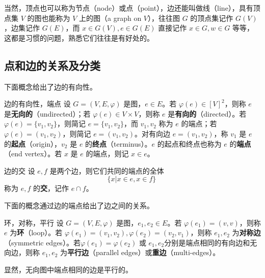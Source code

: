 当然，顶点也可以称为节点（node）或点（point），边还能叫做线（line），具有顶点集 $V$ 的图也能称为 $V$ 上的图（a graph on $V$），往往图 $G$ 的顶点集记作 $G(V)$，边集记作 $G(E)$，而 $x\in G(V),e\in G(E)$ 直接记作 $x\in G,w\in G$ 等等，这都是习惯的问题，熟悉它们往往是有好处的。

\subsection{点和边的关系及分类}


下面概念给出了边的有向性。
\begin{definition}{边的有向性，端点}
设 $G=(V,E,\varphi)$ 是图，$e\in E$。若 $\varphi(e)\in[V]^2$，则称 $e$ 是\textbf{无向的}（undirected）；若 $\varphi(e)\in V\times V$，则称 $e$ 是\textbf{有向的}（directed）。若 $\varphi(e)=\{v_1,v_2\}$，则简记 $e=\{v_1,v_2\}$，而 $v_1,v_2$ 称为 $e$ 的端点；若 $\varphi(e)=(v_1,v_2)$，则简记 $e=(v_1,v_2)$。对有向边 $e=(v_1,v_2)$，称 $v_1$ 是 $e$ 的\textbf{起点}（origin），$v_2$ 是 $e$ 的\textbf{终点}（terminus）。$e$ 的起点和终点也称为 $e$ 的\textbf{端点}（end vertex）。若 $x$ 是 $e$ 的端点，则记 $x\in e$。
\end{definition}

\begin{definition}{边的交}
设 $e,f$ 是两个边，则它们共同的端点的全体
\begin{equation}
\{x|x\in e,x\in f\}~
\end{equation}
称为 $e,f$ 的\textbf{交}，记作 $e\cap f$。
\end{definition}

下面的概念通过边的端点给出了边之间的关系。
\begin{definition}{环，对称，平行}
设 $G=(V,E,\varphi)$ 是图，$e_1,e_2\in E$。若 $\varphi(e_1)=(v,v)$，则称 $e$ 为\textbf{环}（loop）。若 $\varphi(e_1)=(v_1,v_2),\varphi(e_2)=(v_2,v_1)$，则称 $e_1,e_2$ 为\textbf{对称边}（symmetric edges）。若$\varphi(e_1)=\varphi(e_2)$ 或 $e_1,e_2$分别是端点相同的有向边和无向边，则称 $e_1,e_2$ 为\textbf{平行边}（parallel edges）或\textbf{重边}（multi-edges）。
\end{definition}
显然，无向图中端点相同的边是平行的。


